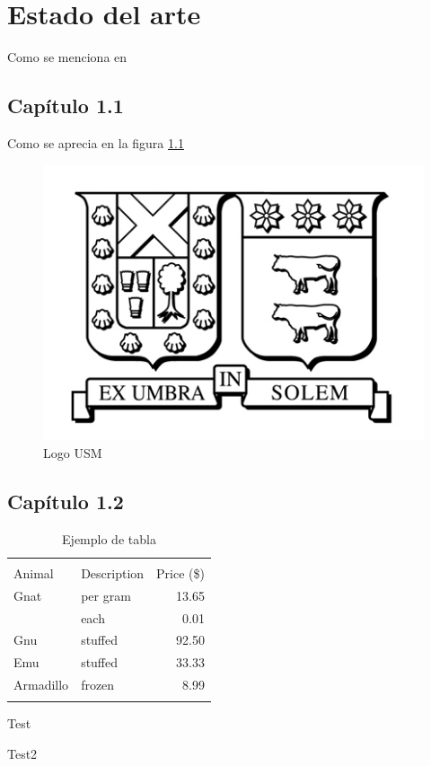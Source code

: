 \chapter{Estado del arte}

Como se menciona en \cite{method}\cite{modnegweb}\cite{modnegweb2}

\section{Capítulo 1.1}

Como se aprecia en la figura \ref{usm}

\begin{figure}[H]
\centering
\includegraphics[scale=0.5]{cap1/fig/ISOTIPO_Negro.jpg}
\caption{Logo USM}
\label{usm}
\end{figure}

\section{Capítulo 1.2}

\begin{table}
\centering
\begin{tabular}{llr}
\hline\noalign{\smallskip}
\multicolumn{2}{c}{Item} \\
\cline{1-2}\noalign{\smallskip}
Animal & Description & Price (\$) \\
\noalign{\smallskip}\hline\noalign{\smallskip}
Gnat  & per gram & 13.65 \\
      & each     &  0.01 \\
Gnu   & stuffed  & 92.50 \\
Emu   & stuffed  & 33.33 \\
Armadillo & frozen & 8.99 \\
\noalign{\smallskip}\hline
\end{tabular}
\caption{Ejemplo de tabla}
\end{table}

\newpage

Test

\newpage

Test2
